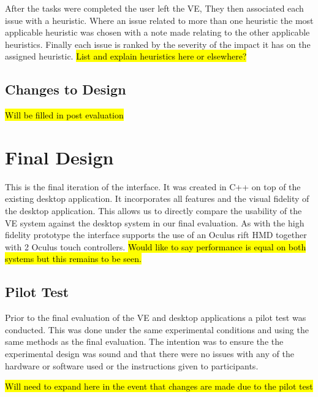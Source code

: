 \documentclass{article}
\begin{document}
\newline\newline
After the tasks were completed the user left the VE, They then associated each issue with a heuristic. Where an issue related to more than one heuristic the most applicable heuristic was chosen with a note made relating to the other applicable heuristics\cite{Sutcliffe2004}. Finally each issue is ranked by the severity of the impact it has on the assigned heuristic.
\newline\newline
\hl{List and explain heuristics here or elsewhere?}

\subsection{Changes to Design}

\hl{Will be filled in post evaluation}

\section{Final Design}

This is the final iteration of the interface. It was created in C++ on top of the existing desktop application. It incorporates all features and the visual fidelity of the desktop application. This allows us to directly compare the usability of the VE system against the desktop system in our final evaluation.
\newline\newline
As with the high fidelity prototype the interface supports the use of an Oculus rift HMD together with 2 Oculus touch controllers. \hl{Would like to say performance is equal on both systems but this remains to be seen.}

\subsection{Pilot Test}

Prior to the final evaluation of the VE and desktop applications a pilot test was conducted. This was done under the same experimental conditions and using the same methods as the final evaluation. The intention was to ensure the the experimental design was sound and that there were no issues with any of the hardware or software used or the instructions given to participants.

\hl{Will need to expand here in the event that changes are made due to the pilot test}
\end{document}
